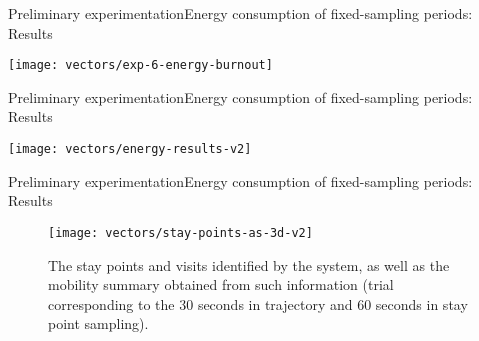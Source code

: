 \begin{frame}[noframenumbering]{Preliminary experimentation}{Energy consumption of fixed-sampling periods: Results}
\vspace{-0.4cm}
{
  \centering
  \texttt{[image: vectors/exp-6-energy-burnout]}
  \par
}
\end{frame}


\begin{frame}[noframenumbering]{Preliminary experimentation}{Energy consumption of fixed-sampling periods: Results}
\vspace{-0.4cm}
{
  \centering
  \texttt{[image: vectors/energy-results-v2]}
  \par
}
\end{frame}

\begin{frame}[noframenumbering]{Preliminary experimentation}{Energy consumption of fixed-sampling periods: Results}
\begin{figure}
  \texttt{[image: vectors/stay-points-as-3d-v2]}
  \caption{The stay points and visits identified by the system, as well as the mobility summary obtained from such information (trial corresponding to the 30 seconds in trajectory and 60 seconds in stay point sampling).}
\end{figure}
\end{frame}
